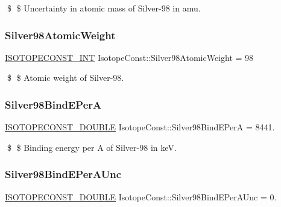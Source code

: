 \$ \$ Uncertainty in atomic mass of Silver-\/98 in amu. \mbox{\label{group___isotope_const-_silver-_ag98_ga63cb3e54a7540600a87c341eb21477bd}} 
\subsubsection{\texorpdfstring{Silver98\+Atomic\+Weight}{Silver98AtomicWeight}}
{\footnotesize\ttfamily \mbox{\hyperlink{group___isotope_const-_macros_ga5f18360b3e99483a35c32d789e62621c}{I\+S\+O\+T\+O\+P\+E\+C\+O\+N\+S\+T\+\_\+\+I\+NT}} Isotope\+Const\+::\+Silver98\+Atomic\+Weight = 98}

\$ \$ Atomic weight of Silver-\/98. \mbox{\label{group___isotope_const-_silver-_ag98_gaffcba211da6369bf092135bd397cffd5}} 
\subsubsection{\texorpdfstring{Silver98\+Bind\+E\+PerA}{Silver98BindEPerA}}
{\footnotesize\ttfamily \mbox{\hyperlink{group___isotope_const-_macros_ga8f45a7272ce02c0b4c65c44636ed719a}{I\+S\+O\+T\+O\+P\+E\+C\+O\+N\+S\+T\+\_\+\+D\+O\+U\+B\+LE}} Isotope\+Const\+::\+Silver98\+Bind\+E\+PerA = 8441.}

\$ \$ Binding energy per A of Silver-\/98 in keV. \mbox{\label{group___isotope_const-_silver-_ag98_ga78035b64bce3af1118b9c8206e6bf648}} 
\subsubsection{\texorpdfstring{Silver98\+Bind\+E\+Per\+A\+Unc}{Silver98BindEPerAUnc}}
{\footnotesize\ttfamily \mbox{\hyperlink{group___isotope_const-_macros_ga8f45a7272ce02c0b4c65c44636ed719a}{I\+S\+O\+T\+O\+P\+E\+C\+O\+N\+S\+T\+\_\+\+D\+O\+U\+B\+LE}} Isotope\+Const\+::\+Silver98\+Bind\+E\+Per\+A\+Unc = 0.}

